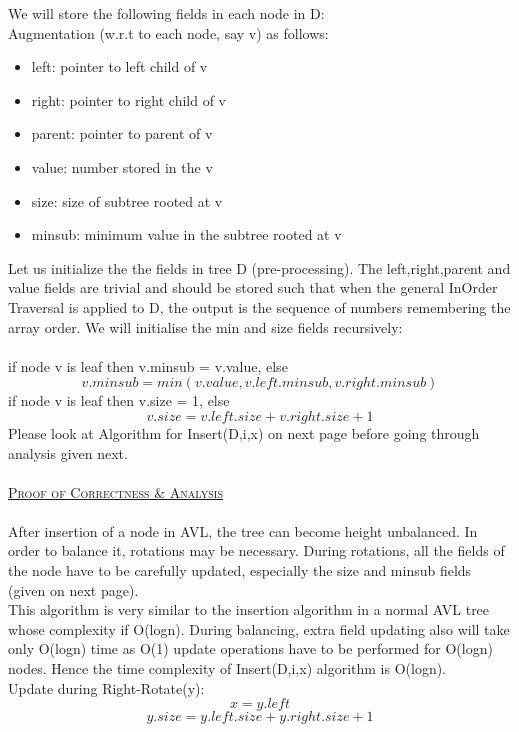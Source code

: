 \documentclass[a4 paper]{article}
\begin{document}
We will store the following fields in each node in D:\\
Augmentation (w.r.t to each node, say v) as follows:
\begin{itemize}
  \item[\textendash] left: pointer to left child of v
  \item[\textendash] right: pointer to right child of v
  \item[\textendash] parent: pointer to parent of v
  \item[\textendash] value: number stored in the v
  \item[\textendash] size: size of subtree rooted at v
  \item[\textendash] minsub: minimum value in the subtree rooted at v
\end{itemize}
Let us initialize the the fields in tree D (pre-processing). The left,right,parent and value fields are trivial and should be stored such that when the general InOrder Traversal is applied to D, the output is the sequence of numbers remembering the array order. We will initialise the min and size fields recursively:\\\\
if node v is leaf then v.minsub = v.value, else 
$$v.minsub = min(v.value, v.left.minsub, v.right.minsub)$$
if node v is leaf then v.size = 1, else
$$v.size = v.left.size + v.right.size + 1$$
Please look at Algorithm for Insert(D,i,x) on next page before going through analysis given next.\\\\
\underline{\textsc{Proof of Correctness \&  Analysis}}\\\\
After insertion of a node in AVL, the tree can become height unbalanced. In order to balance it, rotations may be necessary. During rotations, all the fields of the node have to be carefully updated, especially the size and minsub fields (given on next page).\\
This algorithm is very similar to the insertion algorithm in a normal AVL tree whose complexity if O(logn). During balancing, extra field updating also will take only O(logn) time as O(1) update operations have to be performed for O(logn) nodes. Hence the time complexity of Insert(D,i,x) algorithm is O(logn).\\
\newpage
{}
Update during Right-Rotate(y):\\
$$x = y.left$$
$$y.size = y.left.size + y.right.size + 1$$
\end{document}
